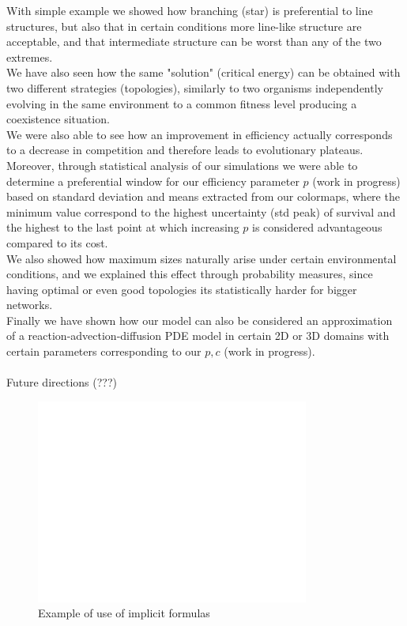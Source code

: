 \documentclass{amsart}
\theoremstyle{plain}
\numberwithin{equation}{section}
\begin{document}
With simple example we showed how branching (star) is preferential to line structures, but also that in certain conditions more line-like structure are acceptable, and that intermediate structure can be worst than any of the two extremes.\\
We have also seen how the same "solution" (critical energy) can be obtained with two different strategies (topologies), similarly to two organisms independently evolving in the same environment to a common fitness level producing a coexistence situation.\\
We were also able to see how an improvement in efficiency actually corresponds to a decrease in competition and therefore leads to evolutionary plateaus.\\
Moreover, through statistical analysis of our simulations we were able to determine a preferential window for our efficiency parameter $p$ (work in progress) based on standard deviation and means extracted from our colormaps, where the minimum value correspond to the highest uncertainty (std peak) of survival and the highest to the last point at which increasing $p$ is considered advantageous compared to its cost.\\
We also showed how  maximum sizes naturally arise under certain environmental conditions, and we explained this effect through probability measures, since having optimal or even good topologies its statistically harder for bigger networks.\\
Finally we have shown how our model can also be considered an approximation of a reaction-advection-diffusion PDE model in certain 2D or 3D domains with certain parameters corresponding to our $p,c$ (work in progress).\\
\\
Future directions (???)


\begin{figure}[p]
    \centering
    \includegraphics[width=0.8\textwidth]{untitled.jpg}
    \caption{Example of use of implicit formulas}
    \label{fig1}
\end{figure}
\end{document}
